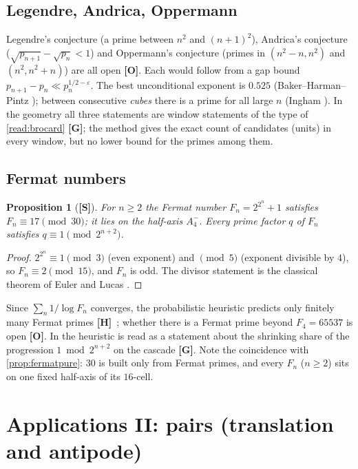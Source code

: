 \documentclass[11pt,a4paper]{article}
\newcommand{\statS}{\textsf{\textbf{[S]}}}
\newcommand{\statG}{\textsf{\textbf{[G]}}}
\newcommand{\statO}{\textsf{\textbf{[O]}}}
\newcommand{\statH}{\textsf{\textbf{[H]}}}
\theoremstyle{plain}
\newtheorem{proposition}[theorem]{Proposition}
\theoremstyle{definition}
\theoremstyle{remark}
\begin{document}
\subsection{Legendre, Andrica, Oppermann}
Legendre's conjecture (a prime between $n^2$ and $(n+1)^2$), Andrica's
conjecture ($\sqrt{p_{n+1}}-\sqrt{p_n}<1$) and Oppermann's conjecture (primes
in $(n^2-n,n^2)$ and $(n^2,n^2+n)$) are all open \statO. Each would follow from
a gap bound $p_{n+1}-p_n\ll p_n^{1/2-\varepsilon}$. The best unconditional
exponent is $0.525$ (Baker--Harman--Pintz \cite{BHP}); between consecutive
\emph{cubes} there is a prime for all large $n$ (Ingham \cite{Ingham}). In the
geometry all three statements are window statements of the type of
\cref{read:brocard} \statG; the method gives the exact count of candidates
(units) in every window, but no lower bound for the primes among them.

\subsection{Fermat numbers}
\begin{proposition}[\statS]\label{prop:fermat}
For $n\ge2$ the Fermat number $F_n=2^{2^n}+1$ satisfies $F_n\equiv17\pmod{30}$;
it lies on the half-axis $A_4^-$. Every prime factor $q$ of $F_n$ satisfies
$q\equiv1\pmod{2^{n+2}}$.
\end{proposition}
\begin{proof}
$2^{2^n}\equiv1\pmod3$ (even exponent) and $\pmod5$ (exponent divisible by $4$),
so $F_n\equiv2\pmod{15}$, and $F_n$ is odd. The divisor statement is the
classical theorem of Euler and Lucas \cite{HardyWright}.
\end{proof}
Since $\sum_n1/\log F_n$ converges, the probabilistic heuristic predicts only
finitely many Fermat primes \statH\ \cite{HardyWright}; whether there is a
Fermat prime beyond $F_4=65537$ is open \statO. In \cite{K-fermat} the
heuristic is read as a statement about the shrinking share of the
progression $1\bmod2^{n+2}$ on the cascade \statG. Note the coincidence with
\cref{prop:fermatpure}: $30$ is built only from Fermat primes, and every $F_n$
($n\ge2$) sits on one fixed half-axis of its $16$-cell.

\section{Applications II: pairs (translation and antipode)}\label{sec:pairs}
\end{document}
